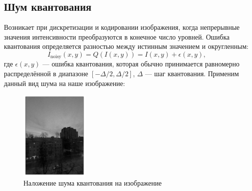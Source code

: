 \documentclass[a4paper,12pt]{article}
\begin{document}
\subsection{Шум квантования}
Возникает при дискретизации и кодировании изображения, когда непрерывные значения интенсивности преобразуются в конечное число уровней. Ошибка квантования определяется разностью между истинным значением и округленным:
\begin{equation}
    I_{\text{noisy}}(x,y) = Q(I(x,y)) = I(x,y) + \epsilon(x,y),
    \label{eq:quantization}
\end{equation}
где \(\epsilon(x,y)\) --- ошибка квантования, которая обычно принимается равномерно распределённой в диапазоне \([-\Delta/2, \Delta/2]\), \(\Delta\) --- шаг квантования.
Применим данный вид шума на наше изображение:
\begin{figure}[H]
    \centering \includegraphics[width=0.3\textwidth]{results/pois.png}
    \caption{Наложение шума квантования на изображение}
\end{figure}
\end{document}

